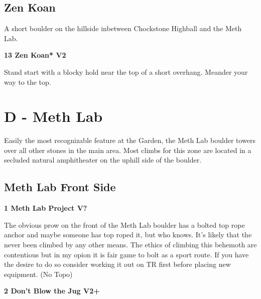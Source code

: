 \begin{multicols}{2}
			\subsection*{Zen Koan}\label{bf:Zen Koan}
			A short boulder on the hillside inbetween Chockstone Highball and the Meth Lab.\\
			

					\label{rt:Zen Koan}
\colorbox{green!20}{
\parbox{0.95\linewidth}{
\textbf{
13 Zen Koan* V2    
}
}
}

					\begin{adjustwidth}{0.5cm}{}				
					Stand start with a blocky hold near the top of a short overhang. Meander your way to the top.
					\end{adjustwidth}
\newpage

		\section{D - Meth Lab}\label{sa:Meth Lab}
	Easily the most recognizable feature at the Garden, the Meth Lab boulder towers over all other stones in the main area. Most climbs for this zone are located in a secluded natural amphitheater on the uphill side of the boulder.\\

	

			\subsection*{Meth Lab Front Side}\label{bf:Meth Lab Front Side}
						
					\label{rt:Meth Lab Project}
\colorbox{black!20}{
\parbox{0.95\linewidth}{
\textbf{
1 Meth Lab Project V?  \warn \warn \warn 
}
}
}

					\begin{adjustwidth}{0.5cm}{}				
					The obvious prow on the front of the Meth Lab boulder has a bolted top rope anchor and maybe someone has top roped it, but who knows. It's likely that the never been climbed by any other means. The ethics of climbing this behemoth are contentious but in my opion it is fair game to bolt as a sport route. If you have the desire to do so consider working it out on TR first before placing new equipment.
						\newline (No Topo) 
					\end{adjustwidth}
					\label{rt:Don't Blow the Jug}
\colorbox{green!20}{
\parbox{0.95\linewidth}{
\textbf{
2 Don't Blow the Jug V2+    \warn 
}
}
}


\end{multicols}
